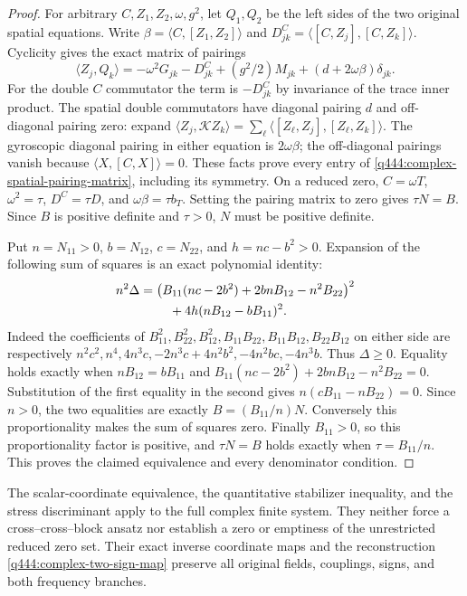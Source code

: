\begin{proof}
For arbitrary $C,Z_1,Z_2,\omega,g^2$, let $Q_1,Q_2$ be the left sides
of the two original spatial equations. Write
$\beta=\langle C,[Z_1,Z_2]\rangle$ and
$D^C_{jk}=\langle[C,Z_j],[C,Z_k]\rangle$. Cyclicity gives the exact
matrix of pairings
\begin{equation}
\langle Z_j,Q_k\rangle
=-\omega^2G_{jk}-D^C_{jk}+(g^2/2)M_{jk}
+(d+2\omega\beta)\delta_{jk}.
\label{q444:complex-spatial-pairing-matrix}
\end{equation}
For the double $C$ commutator the term is $-D^C_{jk}$ by invariance
of the trace inner product. The spatial double commutators have
diagonal pairing $d$ and off-diagonal pairing zero: expand
$\langle Z_j,\mathcal KZ_k\rangle
=\sum_\ell\langle[Z_\ell,Z_j],[Z_\ell,Z_k]\rangle$.
The gyroscopic diagonal pairing in either equation is $2\omega\beta$;
the off-diagonal pairings vanish because $\langle X,[C,X]\rangle=0$.
These facts prove every entry of \eqref{q444:complex-spatial-pairing-matrix},
including its symmetry.
On a reduced zero, $C=\omega T$, $\omega^2=\tau$,
$D^C=\tau D$, and $\omega\beta=\tau b_T$. Setting the pairing matrix
to zero gives $\tau N=B$. Since $B$ is positive definite and $\tau>0$,
$N$ must be positive definite.

Put $n=N_{11}>0$, $b=N_{12}$, $c=N_{22}$, and $h=nc-b^2>0$.
Expansion of the following sum of squares is an exact polynomial identity:
\begin{align}
n^2\Delta={}&
\bigl(B_{11}(nc-2b^2)+2bnB_{12}-n^2B_{22}\bigr)^2\notag\\
&\quad+4h(nB_{12}-bB_{11})^2.
\label{q444:complex-stress-squares}
\end{align}
Indeed the coefficients of $B_{11}^2,B_{22}^2,B_{12}^2,
B_{11}B_{22},B_{11}B_{12},B_{22}B_{12}$ on either side are respectively
$n^2c^2,n^4,4n^3c,-2n^3c+4n^2b^2,-4n^2bc,-4n^3b$.
Thus $\Delta\ge0$. Equality holds exactly when
$nB_{12}=bB_{11}$ and
$B_{11}(nc-2b^2)+2bnB_{12}-n^2B_{22}=0$.
Substitution of the first equality in the second gives
$n(cB_{11}-nB_{22})=0$. Since $n>0$, the two equalities are exactly
$B=(B_{11}/n)N$. Conversely this proportionality makes the sum of
squares zero. Finally $B_{11}>0$, so this proportionality factor is
positive, and $\tau N=B$ holds exactly when $\tau=B_{11}/n$.
This proves the claimed equivalence and every denominator condition.
\end{proof}

The scalar-coordinate equivalence, the quantitative stabilizer
inequality, and the stress discriminant apply to the full complex
finite system. They neither force a cross--cross--block ansatz nor
establish a zero or emptiness of the unrestricted reduced zero set.
Their exact inverse coordinate maps and the reconstruction
\eqref{q444:complex-two-sign-map} preserve all original fields,
couplings, signs, and both frequency branches.

